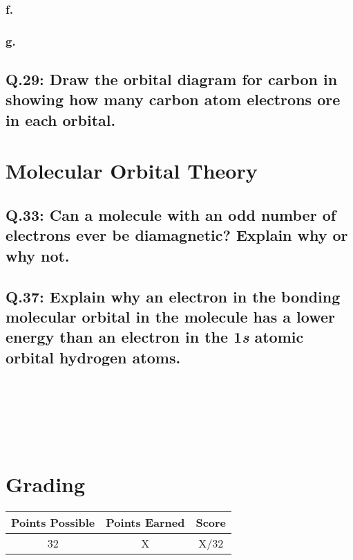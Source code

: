 \documentclass[11pt, letterpaper]{article}
\begin{document}
\subsubsection*{f. }

\subsubsection*{g. }


\subsection*{Q.29: Draw the orbital diagram for carbon in  showing how many carbon atom
electrons ore in each orbital.}


\section{Molecular Orbital Theory}

\subsection*{Q.33: Can a molecule with an odd number of electrons ever be diamagnetic?
Explain why or why not.}


\subsection*{Q.37: Explain why an electron in the bonding molecular orbital in the 
molecule has a lower energy than an electron in the 1\textit{s} atomic orbital hydrogen atoms.}


\\
\;
\\

\hline

\\
\;
\\

\section*{Grading}

\begin{center}
	\begin{tabular}{|c|c||c|}
		\hline
		\textbf{Points Possible} & \textbf{Points Earned} & \textbf{Score} \\
		\hline
		32 & X & X/32 \\
		\hline
	\end{tabular}
\end{center}
\end{document}
